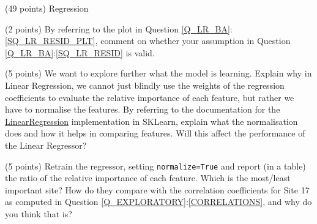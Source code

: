 \documentclass[12pt]{article}
\begin{document}
\begin{question}{\label{Q_LR_BA}(49 points) Regression}
\begin{subquestion}



\end{subquestion}

\begin{subquestion}{(2 points) By referring to the plot in Question \ref{Q_LR_BA}:\ref{SQ_LR_RESID_PLT}, comment on whether your assumption in Question \ref{Q_LR_BA}:\ref{SQ_LR_RESID} is valid.}






\end{subquestion}



\begin{subquestion}{(5 points) We want to explore further what the model is learning. Explain why in Linear Regression, we cannot just blindly use the weights of the regression coefficients to evaluate the relative importance of each feature, but rather we have to normalise the features. By referring to the documentation for the \href{http://scikit-learn.org/stable/modules/generated/sklearn.linear_model.LinearRegression.html}{LinearRegression} implementation in SKLearn, explain what the normalisation does and how it helps in comparing features. Will this affect the performance of the Linear Regressor?}






\end{subquestion}

\begin{subquestion}{(5 points) Retrain the regressor, setting \texttt{normalize=True} and report (in a table) the ratio of the relative importance of each feature. Which is the most/least important site? How do they compare with the correlation coefficients for Site 17 as computed in Question \ref{Q_EXPLORATORY}:\ref{CORRELATIONS}, and why do you think that is?}




\end{subquestion}
\end{question}
\end{document}
